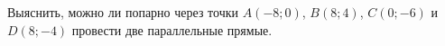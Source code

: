 \begin{ex}
	\begin{condition}
		Выяснить, можно ли попарно через точки \( A(-8;0) \), \( B(8;4) \), \( C(0;-6) \) и \( D(8;-4) \) провести две параллельные прямые.
	\end{condition}
\end{ex}